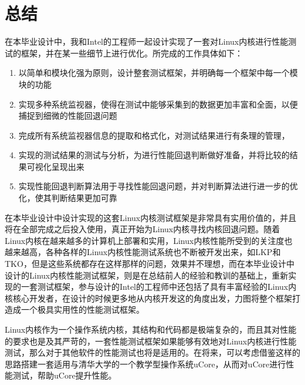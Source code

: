 

\chapter{总结}
在本毕业设计中，我和Intel的工程师一起设计实现了一套对Linux内核进行性能测试的框架，并在某一些细节上进行优化。所完成的工作具体如下：
\begin{enumerate}
\item 以简单和模块化强为原则，设计整套测试框架，并明确每一个框架中每一个模块的功能
\item 实现多种系统监视器，使得在测试中能够采集到的数据更加丰富和全面，以便捕捉到细微的性能回退问题
\item 完成所有系统监视器信息的提取和格式化，对测试结果进行有条理的管理，
\item 实现的测试结果的测试与分析，为进行性能回退判断做好准备，并将比较的结果可视化呈现出来
\item 实现性能回退判断算法用于寻找性能回退问题，并对判断算法进行进一步的优化，使其判断结果更加可靠
\end{enumerate}

在本毕业设计中设计实现的这套Linux内核测试框架是非常具有实用价值的，并且将在全部完成之后投入使用，真正开始为Linux内核寻找内核回退问题。随着Linux内核在越来越多的计算机上部署和实用，Linux内核性能所受到的关注度也越来越高，各种各样的Linux内核性能测试系统也不断被开发出来，如LKP\cite{chen2007keeping}和TKO\cite{bligh2006fully}，但是这些系统都存在这样那样的问题，效果并不理想，而在本毕业设计中设计的Linux内核性能测试框架，则是在总结前人的经验和教训的基础上，重新实现的一套测试框架，参与设计的Intel的工程师中还包括了具有丰富经验的Linux内核核心开发者，在设计的时候更多地从内核开发这的角度出发，力图将整个框架打造成一个极具实用性的性能测试框架。


Linux内核作为一个操作系统内核，其结构和代码都是极端复杂的，而且其对性能的要求也是及其严苛的，一套性能测试框架如果能够有效地对Linux内核进行性能测试，那么对于其他软件的性能测试也将是适用的。在将来，可以考虑借鉴这样的思路搭建一套适用与清华大学的一个教学型操作系统uCore，从而对uCore进行性能测试，帮助uCore提升性能。